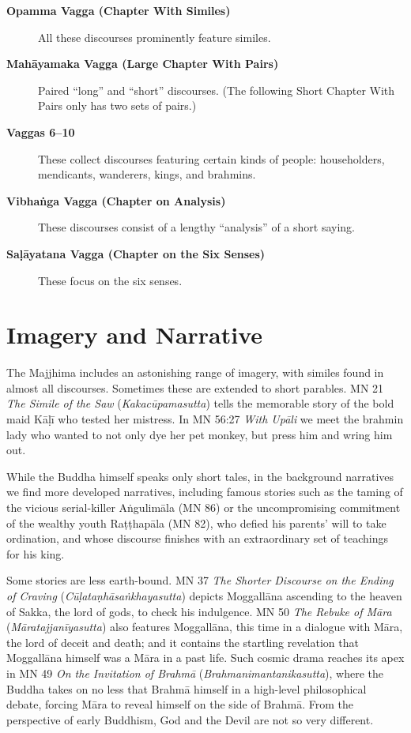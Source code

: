 \documentclass[12pt,openany]{book}%
\begin{document}
\begin{description}%
\item[\textbf{Opamma Vagga (Chapter With Similes)}] All these discourses prominently feature similes.%
\item[\textbf{\textsanskrit{Mahāyamaka} Vagga (Large Chapter With Pairs)}] Paired “long” and “short” discourses. (The following Short Chapter With Pairs only has two sets of pairs.)%
\item[\textbf{Vaggas 6–10}] These collect discourses featuring certain kinds of people: householders, mendicants, wanderers, kings, and brahmins.%
\item[\textbf{\textsanskrit{Vibhaṅga} Vagga (Chapter on Analysis)}] These discourses consist of a lengthy “analysis” of a short saying.%
\item[\textbf{\textsanskrit{Saḷāyatana} Vagga (Chapter on the Six Senses)}] These focus on the six senses.%
\end{description}

\section*{Imagery and Narrative}

The Majjhima includes an astonishing range of imagery, with similes found in almost all discourses. Sometimes these are extended to short parables. MN 21 \textit{The Simile of the Saw} (\textit{\textsanskrit{Kakacūpamasutta}}) tells the memorable story of the bold maid \textsanskrit{Kāḷī} who tested her mistress. In MN 56:27 \textit{With \textsanskrit{Upāli}} we meet the brahmin lady who wanted to not only dye her pet monkey, but press him and wring him out.

While the Buddha himself speaks only short tales, in the background narratives we find more developed narratives, including famous stories such as the taming of the vicious serial-killer \textsanskrit{Aṅgulimāla} (MN 86) or the uncompromising commitment of the wealthy youth \textsanskrit{Raṭṭhapāla} (MN 82), who defied his parents’ will to take ordination, and whose discourse finishes with an extraordinary set of teachings for his king.

Some stories are less earth-bound. MN 37 \textit{The Shorter Discourse on the Ending of Craving} (\textit{\textsanskrit{Cūḷataṇhāsaṅkhayasutta}}) depicts \textsanskrit{Moggallāna} ascending to the heaven of Sakka, the lord of gods, to check his indulgence. MN 50 \textit{The Rebuke of \textsanskrit{Māra}} (\textit{\textsanskrit{Māratajjanīyasutta}}) also features \textsanskrit{Moggallāna}, this time in a dialogue with \textsanskrit{Māra}, the lord of deceit and death; and it contains the startling revelation that \textsanskrit{Moggallāna} himself was a \textsanskrit{Māra} in a past life. Such cosmic drama reaches its apex in MN 49 \textit{On the Invitation of \textsanskrit{Brahmā}} (\textit{Brahmanimantanikasutta}), where the Buddha takes on no less that \textsanskrit{Brahmā} himself in a high-level philosophical debate, forcing \textsanskrit{Māra} to reveal himself on the side of \textsanskrit{Brahmā}. From the perspective of early Buddhism, God and the Devil are not so very different.
\end{document}

